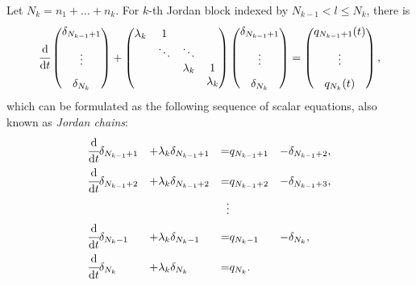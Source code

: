 \documentclass[]{uai2023}
\newcommand{\dt}[1]{\cfrac{\mathrm{d} #1}{\mathrm{d} t}}
\begin{document}
    Let $N_k = n_1+\dots + n_k$. For $k$-th Jordan block indexed by $N_{k-1} < l \leq N_k$, there is
    \begin{equation}
        \dt{}
        \begin{pmatrix}
            \delta_{N_{k-1} + 1} \\[0.8em] \vdots \\[0.8em] \delta_{N_k}
        \end{pmatrix} 
        + 
        \begin{pmatrix}
            \lambda_k & 1 \\
            & \ddots & \ddots \\
            & & \lambda_k & 1\\
            & & & \lambda_k \\
        \end{pmatrix}
        \begin{pmatrix}
            \delta_{N_{k-1} + 1} \\[0.8em] \vdots \\[0.8em] \delta_{N_k}
        \end{pmatrix} 
        =
        \begin{pmatrix}
            q_{N_{k-1} + 1}(t) \\[0.8em] \vdots \\[0.8em] q_{N_k}(t)
        \end{pmatrix},
    \end{equation}
    which can be formulated as the following sequence of scalar equations, also known as \textit{Jordan chains}:
    \begin{alignat}{4}
        &\dt{}\delta_{N_{k-1} + 1} &+&\lambda_k\delta_{N_{k-1} + 1} &=& q_{N_{k-1}+1} &-& \delta_{N_{k-1}+2}, \label{eq:jordan-chain-first}\\
        &\dt{}\delta_{N_{k-1} + 2} &+&\lambda_k\delta_{N_{k-1} + 2} &=& q_{N_{k-1}+2} &-& \delta_{N_{k-1}+3}, \label{eq:jordan-chain-second}\\
        &&&& \vdots \nonumber\\
        &\dt{}\delta_{N_k-1} &+&\lambda_k\delta_{N_k-1} &=& q_{N_k-1} &-& \delta_{N_k}, \label{eq:jordan-chain-second2last}\\
        &\dt{}\delta_{N_k} &+& \lambda_k\delta_{N_k} &=& q_{N_k}. \label{eq:jordan-chain-last}
    \end{alignat}
\end{document}
